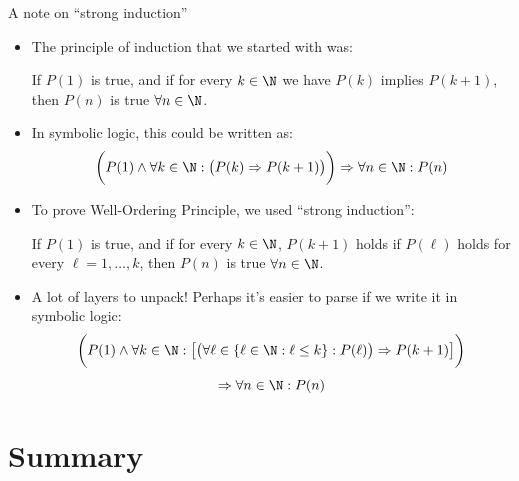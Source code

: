 \documentclass[11pt,aspectratio=1610,handout]{beamer}
\begin{document}
\begin{frame}{A note on ``strong induction''}
	\begin{itemize}
		\item The principle of induction that we started with was: 
		\begin{center}
			If $P(1)$ is true, and if for every $k \in \N$ we have $P(k)$ implies $P(k+1)$, then $P(n)$ is true $\forall n \in \N$. 
		\end{center}\p 
		\item In symbolic logic, this could be written as: 
		\[
		\bigg( P(1) \wedge \forall k \in \N :\big( P(k) \Rightarrow P(k+1)\big)\bigg) \Rightarrow \forall n \in \N: P(n)
		\] \p
		\item To prove Well-Ordering Principle, we used ``strong induction'':
		\begin{center}
			If $P(1)$ is true, and if for every $k \in \N$, $P(k+1)$ holds if $P(\ell)$ holds for every $\ell = 1, \ldots, k$, then $P(n)$ is true $\forall n \in \N$. 
		\end{center} \p
		\item A lot of layers to unpack! Perhaps it's easier to parse if we write it in symbolic logic: 
		\[
		\bigg( P(1) \wedge \forall k \in \N: \big[ \big( \forall \ell \in \{\ell \in \N : \ell \leq k\}: P(\ell)\big) \Rightarrow P(k+1)\big]\bigg) 
		\]
		\[\Rightarrow \forall n \in \N: P(n)
		\]
	\end{itemize}
\end{frame}


\section{Summary}
\end{document}
